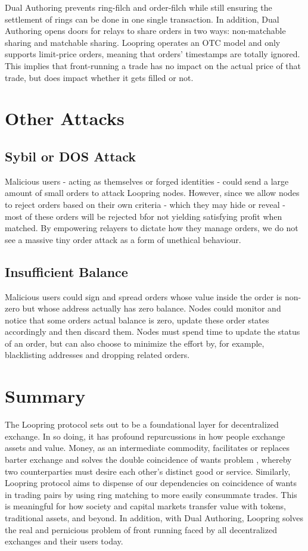 \documentclass[UTF8,nofonts]{article}
\begin{document}
Dual Authoring prevents ring-filch and order-filch while still ensuring the settlement of rings can be done in one single transaction. In addition, Dual Authoring opens doors for relays to share orders in two ways: non-matchable sharing and matchable sharing. Loopring operates an OTC model and only supports limit-price orders, meaning that orders’ timestamps are totally ignored. This implies that front-running a trade has no impact on the actual price of that trade, but does impact whether it gets filled or not.

\section{Other Attacks}

\subsection{Sybil or DOS Attack}
Malicious users - acting as themselves or forged identities - could send a large amount of small orders to attack Loopring nodes. However, since we allow nodes to reject orders based on their own criteria - which they may hide or reveal - most of these orders will be rejected bfor not yielding satisfying profit when matched.  By empowering relayers to dictate how they manage orders, we do not see a massive tiny order attack as a form of unethical behaviour.

\subsection{Insufficient Balance}
Malicious users could sign and spread orders whose value inside the order is non-zero but whose address actually has zero balance. Nodes could monitor and notice that some orders actual balance is zero, update these order states accordingly and then discard them.
Nodes must spend time to update the status of an order, but can also choose to minimize the effort by, for example, blacklisting addresses and dropping related orders.


\section{Summary}
The Loopring protocol sets out to be a foundational layer for decentralized exchange. In so doing, it has profound repurcussions in how people exchange assets and value. Money, as an intermediate commodity, facilitates or replaces barter exchange and solves the double coincidence of wants problem \cite{unenumerated2006}, whereby two counterparties must desire each other's distinct good or service. Similarly, Loopring protocol aims to dispense of our dependencies on coincidence of wants in trading pairs by using ring matching to more easily consummate trades. This is meaningful for how society and capital markets transfer value with tokens, traditional assets, and beyond. In addition, with Dual Authoring, Loopring solves the real and pernicious problem of front running faced by all decentralized exchanges and their users today.
\end{document}
